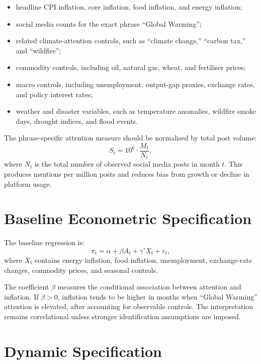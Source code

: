 \documentclass[12pt]{article}
\begin{document}
\begin{itemize}
    \item headline CPI inflation, core inflation, food inflation, and energy inflation;
    \item social media counts for the exact phrase ``Global Warming'';
    \item related climate-attention controls, such as ``climate change,'' ``carbon tax,'' and ``wildfire'';
    \item commodity controls, including oil, natural gas, wheat, and fertiliser prices;
    \item macro controls, including unemployment, output-gap proxies, exchange rates, and policy interest rates;
    \item weather and disaster variables, such as temperature anomalies, wildfire smoke days, drought indices, and flood events.
\end{itemize}

The phrase-specific attention measure should be normalised by total post volume:
\begin{equation}
    S_t = 10^6 \cdot \frac{M_t}{N_t},
\end{equation}
where $N_t$ is the total number of observed social media posts in month $t$. This produces mentions per million posts and reduces bias from growth or decline in platform usage.

\section{Baseline Econometric Specification}

The baseline regression is:
\begin{equation}
    \pi_t = \alpha + \beta A_t + \gamma'X_t + \varepsilon_t,
    \label{eq:baseline}
\end{equation}
where $X_t$ contains energy inflation, food inflation, unemployment, exchange-rate changes, commodity prices, and seasonal controls.

The coefficient $\beta$ measures the conditional association between attention and inflation. If $\beta > 0$, inflation tends to be higher in months when ``Global Warming'' attention is elevated, after accounting for observable controls. The interpretation remains correlational unless stronger identification assumptions are imposed.

\section{Dynamic Specification}
\end{document}
